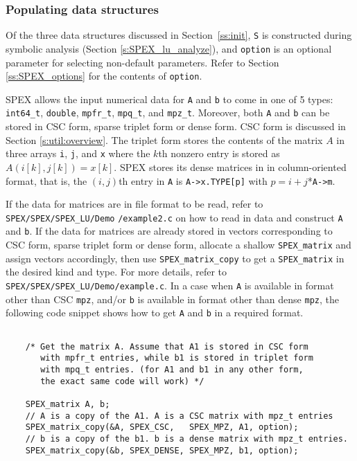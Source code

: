 \documentclass[12pt]{report}
\theoremstyle{definition}
\begin{document}
\subsubsection{Populating data structures}
\label{ss:populate_Ab}

Of the three data structures discussed in Section~\ref{ss:init}, \verb|S| is
constructed during symbolic analysis (Section \ref{s:SPEX_lu_analyze}), and
\verb|option| is an optional parameter for selecting non-default parameters.
Refer to Section \ref{ss:SPEX_options} for the contents of \verb|option|.

SPEX allows the input numerical data for \verb|A| and \verb|b| to come in
one of 5 types: \verb|int64_t|, \verb|double|, \verb|mpfr_t|, \verb|mpq_t|,
and \verb|mpz_t|. Moreover, both \verb|A| and \verb|b| can be stored in
CSC form, sparse triplet form or dense form. CSC form is discussed in Section
\ref{s:util:overview}. The triplet form stores the contents of the matrix $A$
in three arrays \verb|i|, \verb|j|, and \verb|x| where the $k$th nonzero entry
is stored as $A ( i[k], j[k]) = x[k]$. SPEX stores its dense matrices in
in column-oriented format, that is, the $(i,j)$th entry in \verb|A|
is \verb|A->x.TYPE[p]| with $p = i+j$*\verb|A->m|.

If the data for matrices are in file format to be read, refer to
\newline \verb|SPEX/SPEX/SPEX_LU/Demo| \verb|/example2.c| on how to read in data and construct
\verb|A| and \verb|b|. If the data for matrices are already stored in vectors
corresponding to CSC form, sparse triplet form or dense form, allocate a
shallow \verb|SPEX_matrix| and assign vectors accordingly, then use
\verb|SPEX_matrix_copy| to get a \verb|SPEX_matrix| in the desired kind and
type. For more details, refer to \verb|SPEX/SPEX/SPEX_LU/Demo/example.c|. In a case when
\verb|A| is available in format other than CSC \verb|mpz|, and/or \verb|b| is
available in format other than dense \verb|mpz|, the following code snippet
shows how to get \verb|A| and \verb|b| in a required format.

{\small
\begin{verbatim}

    /* Get the matrix A. Assume that A1 is stored in CSC form
       with mpfr_t entries, while b1 is stored in triplet form
       with mpq_t entries. (for A1 and b1 in any other form,
       the exact same code will work) */

    SPEX_matrix A, b;
    // A is a copy of the A1. A is a CSC matrix with mpz_t entries
    SPEX_matrix_copy(&A, SPEX_CSC,   SPEX_MPZ, A1, option);
    // b is a copy of the b1. b is a dense matrix with mpz_t entries. 
    SPEX_matrix_copy(&b, SPEX_DENSE, SPEX_MPZ, b1, option);
    \end{verbatim} }
\end{document}
